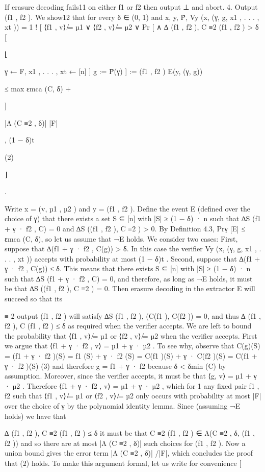 \documentclass[11pt]{article}
\begin{document}
If erasure decoding fails11 on either f1 or f2 then output ⊥ and abort.
4. Output (f1 , f2 ).
We show12 that for every δ ∈ (0, 1) and x, y, P̃,
Vy (x, (γ, g, x1 , . . . , xt )) = 1
!
[
⟨f1 , v⟩ ̸= µ1 ∨ ⟨f2 , v⟩ ̸= µ2 ∨
Pr [
∧
∆ (f1 , f2 ), C ≡2 (f1 , f2 ) > δ
[

⌊

γ ← F, x1 , . . . , xt ← [n]
]
g := P̃(γ)
]
:=
(f1 , f2 )
E(y, (γ, g))

≤ max εmca (C, δ) +

]

|Λ (C ≡2 , δ)|
|F|

, (1 − δ)t

(2)

⌋

.

Write x = (v, µ1 , µ2 ) and y = (f1 , f2 ). Define the event E (defined over the choice of γ) that there
exists a set S ⊆ [n] with |S| ≥ (1 − δ) · n such that ∆S (f1 + γ · f2 , C) = 0 and ∆S ((f1 , f2 ), C ≡2 ) > 0.
By Definition 4.3, Prγ [E] ≤ εmca (C, δ), so let us assume that ¬E holds. We consider two cases:
First, suppose that ∆(f1 + γ · f2 , C(g)) > δ. In this case the verifier Vy (x, (γ, g, x1 , . . . , xt )) accepts
with probability at most (1 − δ)t .
Second, suppose that ∆(f1 + γ · f2 , C(g)) ≤ δ. This means that there exists S ⊆ [n] with |S| ≥
(1 − δ) · n such that ∆S (f1 + γ · f2 , C) = 0, and therefore, as long as ¬E holds, it must be
that ∆S ((f1 , f2 ), C ≡2 ) = 0. Then erasure decoding in the extractor E will succeed so that
its

≡
2
output (f1 , f2 ) will satisfy ∆S (f1 , f2 ), (C(f1 ), C(f2 )) = 0, and thus ∆ (f1 , f2 ), C (f1 , f2 ) ≤ δ
as required when the verifier accepts. We are left to bound the probability that ⟨f1 , v⟩ ̸= µ1 or
⟨f2 , v⟩ ̸= µ2 when the verifier accepts. First we argue that ⟨f1 + γ · f2 , v⟩ = µ1 + γ · µ2 . To see
why, observe that
C(g)(S) = (f1 + γ · f2 )(S) = f1 (S) + γ · f2 (S) = C(f1 )(S) + γ · C(f2 )(S) = C(f1 + γ · f2 )(S) (3)
and therefore g = f1 + γ · f2 because δ < δmin (C) by assumption. Moreover, since the verifier
accepts, it must be that ⟨g, v⟩ = µ1 + γ · µ2 . Therefore ⟨f1 + γ · f2 , v⟩ = µ1 + γ · µ2 , which for
1
any fixed pair f1 , f2 such that ⟨f1 , v⟩ ̸= µ1 or ⟨f2 , v⟩ ̸= µ2 only occurs with probability at most |F|
over the choice of γ by
the polynomial identity lemma. Since (assuming ¬E holds) we have that

∆ (f1 , f2 ), C ≡2 (f1 , f2 ) ≤ δ it must be that C ≡2 (f1 , f2 ) ∈ Λ(C ≡2 , δ, (f1 , f2 )) and so there are at
most |Λ (C ≡2 , δ)| such choices for (f1 , f2 ). Now a union bound gives the error term |Λ (C ≡2 , δ)| /|F|,
which concludes the proof that (2) holds.
To make this argument formal, let us write for convenience
[
\end{document}
